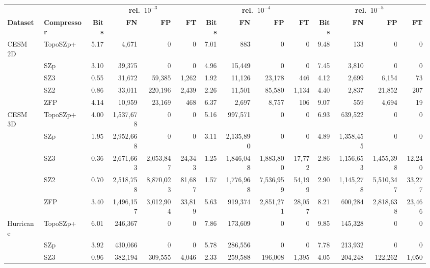 \begin{tabular}{@{}llrrrrrrrrrrrr@{}}
\toprule
 &  & \multicolumn{4}{c}{\textbf{rel.\ $10^{-3}$}} & \multicolumn{4}{c}{\textbf{rel.\ $10^{-4}$}} & \multicolumn{4}{c}{\textbf{rel.\ $10^{-5}$}} \\
\cmidrule(lr){3-6}\cmidrule(lr){7-10}\cmidrule(lr){11-14}
\textbf{Dataset} & \textbf{Compressor} & \textbf{Bits} & \textbf{FN} & \textbf{FP} & \textbf{FT} & \textbf{Bits} & \textbf{FN} & \textbf{FP} & \textbf{FT} & \textbf{Bits} & \textbf{FN} & \textbf{FP} & \textbf{FT} \\
\midrule
CESM 2D & TopoSZp+ & 5.17 & 4{,}671 & 0 & 0 & 7.01 & 883 & 0 & 0 & 9.48 & 133 & 0 & 0 \\
 & SZp & 3.10 & 39{,}375 & 0 & 0 & 4.96 & 15{,}449 & 0 & 0 & 7.45 & 3{,}810 & 0 & 0 \\
 & SZ3 & 0.55 & 31{,}672 & 59{,}385 & 1{,}262 & 1.92 & 11{,}126 & 23{,}178 & 446 & 4.12 & 2{,}699 & 6{,}154 & 73 \\
 & SZ2 & 0.86 & 33{,}011 & 220{,}196 & 2{,}439 & 2.26 & 11{,}501 & 85{,}580 & 1{,}134 & 4.40 & 2{,}837 & 21{,}852 & 207 \\
 & ZFP & 4.14 & 10{,}959 & 23{,}169 & 468 & 6.37 & 2{,}697 & 8{,}757 & 106 & 9.07 & 559 & 4{,}694 & 19 \\
\midrule
CESM 3D & TopoSZp+ & 4.00 & 1{,}537{,}678 & 0 & 0 & 5.16 & 997{,}571 & 0 & 0 & 6.93 & 639{,}522 & 0 & 0 \\
 & SZp & 1.95 & 2{,}952{,}668 & 0 & 0 & 3.11 & 2{,}135{,}890 & 0 & 0 & 4.89 & 1{,}358{,}455 & 0 & 0 \\
 & SZ3 & 0.36 & 2{,}671{,}663 & 2{,}053{,}847 & 24{,}343 & 1.25 & 1{,}846{,}048 & 1{,}883{,}800 & 17{,}772 & 2.86 & 1{,}156{,}653 & 1{,}455{,}398 & 12{,}240 \\
 & SZ2 & 0.70 & 2{,}518{,}758 & 8{,}870{,}023 & 81{,}687 & 1.57 & 1{,}776{,}968 & 7{,}536{,}959 & 54{,}199 & 2.90 & 1{,}145{,}278 & 5{,}510{,}347 & 33{,}277 \\
 & ZFP & 3.40 & 1{,}496{,}157 & 3{,}012{,}904 & 33{,}819 & 5.63 & 919{,}374 & 2{,}851{,}271 & 28{,}057 & 8.21 & 600{,}284 & 2{,}818{,}638 & 23{,}466 \\
\midrule
Hurricane & TopoSZp+ & 6.01 & 246{,}367 & 0 & 0 & 7.86 & 173{,}609 & 0 & 0 & 9.85 & 145{,}328 & 0 & 0 \\
 & SZp & 3.92 & 430{,}066 & 0 & 0 & 5.78 & 286{,}556 & 0 & 0 & 7.78 & 213{,}932 & 0 & 0 \\
 & SZ3 & 0.96 & 382{,}194 & 309{,}555 & 4{,}046 & 2.33 & 259{,}588 & 196{,}008 & 1{,}395 & 4.05 & 204{,}248 & 122{,}262 & 1{,}050 \\

\end{tabular}
